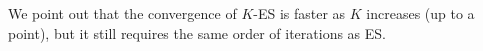 \documentclass{article}
\newtheorem{theorem}{Theorem}
\begin{document}
We point out that the convergence of $K$-ES is faster as $K$ increases (up to a point), but it still requires the same order of iterations as ES.












\end{document}
